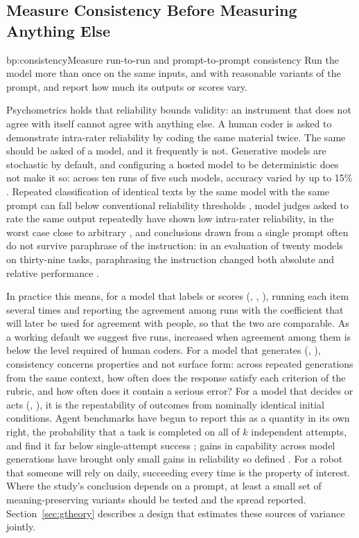 \subsection{Measure Consistency Before Measuring Anything Else}

\begin{practice}{bp:consistency}{Measure run-to-run and prompt-to-prompt consistency}
Run the model more than once on the same inputs, and with reasonable variants
of the prompt, and report how much its outputs or scores vary.
\end{practice}

Psychometrics holds that reliability bounds validity: an instrument that does
not agree with itself cannot agree with anything else. A human coder is asked
to demonstrate intra-rater reliability by coding the same material twice. The
same should be asked of a model, and it frequently is not. Generative models
are stochastic by default, and configuring a hosted model to be
deterministic does not make it so: across ten runs of five such models,
accuracy varied by up to 15\% \cite{atil2025nondeterminism}.
Repeated classification of identical texts by the same model with the same
prompt can fall below conventional reliability thresholds
\cite{reiss2023testing}, model judges asked to rate the same output
repeatedly have shown low intra-rater reliability, in the worst case close to
arbitrary \cite{haldar2025rating,schroeder2024can}, and conclusions drawn
from a single prompt often do not survive paraphrase of the instruction: in
an evaluation of twenty models on thirty-nine tasks, paraphrasing the
instruction changed both absolute and relative performance
\cite{mizrahi2024state}.

In practice this means, for a model that labels or scores (,
, ), running each item several times and reporting the
agreement among runs with the coefficient that will later be used for
agreement with people, so that the two are comparable. As a working default
we suggest five runs, increased when agreement among them is below the level
required of human coders. For a model that generates (, ),
consistency concerns properties and not surface form: across repeated
generations from the same context, how often does the response satisfy each
criterion of the rubric, and how often does it contain a serious error? For a
model that decides or acts (, ), it is the repeatability of
outcomes from nominally identical initial conditions. Agent benchmarks have
begun to report this as a quantity in its own right, the probability that a
task is completed on all of $k$ independent attempts, and find it far below
single-attempt success \cite{yao2025taubench}; gains in capability across
model generations have brought only small gains in reliability so defined
\cite{rabanser2026towards}. For a robot that someone will rely on daily,
succeeding every time is the property of interest. Where the study's conclusion depends on a
prompt, at least a small set of meaning-preserving variants should be tested
and the spread reported. Section~\ref{sec:gtheory} describes a design that
estimates these sources of variance jointly.

